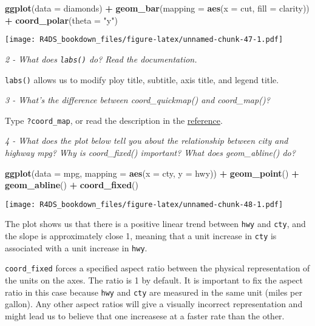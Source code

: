 \documentclass[]{article}
\newenvironment{Shaded}{\begin{snugshade}}{\end{snugshade}}
\newcommand{\KeywordTok}[1]{\textcolor[rgb]{0.13,0.29,0.53}{\textbf{#1}}}
\newcommand{\DataTypeTok}[1]{\textcolor[rgb]{0.13,0.29,0.53}{#1}}
\newcommand{\StringTok}[1]{\textcolor[rgb]{0.31,0.60,0.02}{#1}}
\newcommand{\OperatorTok}[1]{\textcolor[rgb]{0.81,0.36,0.00}{\textbf{#1}}}
\newcommand{\NormalTok}[1]{#1}
\theoremstyle{definition}
\theoremstyle{definition}
\theoremstyle{definition}
\theoremstyle{remark}
\begin{document}
\begin{Shaded}
\begin{Highlighting}[]
\KeywordTok{ggplot}\NormalTok{(}\DataTypeTok{data =}\NormalTok{ diamonds) }\OperatorTok{+}\StringTok{ }
\StringTok{  }\KeywordTok{geom_bar}\NormalTok{(}\DataTypeTok{mapping =} \KeywordTok{aes}\NormalTok{(}\DataTypeTok{x =}\NormalTok{ cut, }\DataTypeTok{fill =}\NormalTok{ clarity)) }\OperatorTok{+}
\StringTok{  }\KeywordTok{coord_polar}\NormalTok{(}\DataTypeTok{theta =} \StringTok{"y"}\NormalTok{)}
\end{Highlighting}
\end{Shaded}

\texttt{[image: R4DS\_bookdown\_files/figure-latex/unnamed-chunk-47-1.pdf]}

\emph{2 - What does \texttt{labs()} do? Read the documentation.}

\texttt{labs()} allows us to modify ploy title, subtitle, axis title,
and legend title.

\emph{3 - What's the difference between coord\_quickmap() and
coord\_map()?}

Type \texttt{?coord\_map}, or read the description in the
\href{http://ggplot2.tidyverse.org/reference/coord_map.html}{reference}.

\emph{4 - What does the plot below tell you about the relationship
between city and highway mpg? Why is coord\_fixed() important? What does
geom\_abline() do?}

\begin{Shaded}
\begin{Highlighting}[]
\KeywordTok{ggplot}\NormalTok{(}\DataTypeTok{data =}\NormalTok{ mpg, }\DataTypeTok{mapping =} \KeywordTok{aes}\NormalTok{(}\DataTypeTok{x =}\NormalTok{ cty, }\DataTypeTok{y =}\NormalTok{ hwy)) }\OperatorTok{+}
\StringTok{  }\KeywordTok{geom_point}\NormalTok{() }\OperatorTok{+}\StringTok{ }
\StringTok{  }\KeywordTok{geom_abline}\NormalTok{() }\OperatorTok{+}
\StringTok{  }\KeywordTok{coord_fixed}\NormalTok{()}
\end{Highlighting}
\end{Shaded}

\texttt{[image: R4DS\_bookdown\_files/figure-latex/unnamed-chunk-48-1.pdf]}

The plot shows us that there is a positive linear trend between
\texttt{hwy} and \texttt{cty}, and the slope is approximately close 1,
meaning that a unit increase in \texttt{cty} is associated with a unit
increase in \texttt{hwy}.

\texttt{coord\_fixed} forces a specified aspect ratio between the
physical representation of the units on the axes. The ratio is 1 by
default. It is important to fix the aspect ratio in this case because
\texttt{hwy} and \texttt{cty} are measured in the same unit (miles per
gallon). Any other aspect ratios will give a visually incorrect
representation and might lead us to believe that one increasese at a
faster rate than the other.
\end{document}
